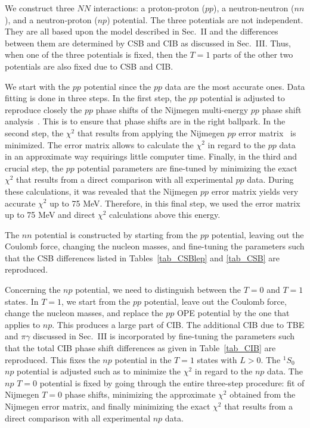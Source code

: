 We construct three $NN$ interactions:
a proton-proton ($pp$), a neutron-neutron ($nn$),
and a neutron-proton ($np$) potential.
The three potentials are not independent. They are all based
upon the model described in Sec.~II and the differences
between them are determined by CSB and CIB as discussed
in Sec.~III. Thus, when one of the three potentials is fixed,
then the $T=1$ parts of the other two potentials
are also fixed due to CSB and CIB.

We start with the $pp$ potential since the $pp$ data are the most
accurate ones. Data fitting is done in three steps. In the first step,
the $pp$ potential is adjusted to reproduce
closely the $pp$ phase shifts of the Nijmegen
multi-energy $pp$ phase shift analysis~\cite{Sto93}.
This is to ensure that phase shifts are in the right ballpark.
In the second step, the $\chi^2$ 
that results
from applying the Nijmegen $pp$ error matrix~\cite{SS93} 
is minimized. 
The error matrix allows to calculate the $\chi^2$ in regard to
the $pp$ data in an approximate way requirings little computer time.
Finally, in the third and crucial step, the $pp$ potential parameters
are fine-tuned by minimizing the exact $\chi^2$ that results from a direct
comparison with all experimental $pp$ data. 
During these calculations, it was revealed that the Nijmegen $pp$ error matrix
yields very accurate $\chi^2$ up to 75 MeV. 
Therefore, in this final step, we used the error matrix up to 75 MeV and
direct $\chi^2$ calculations above this energy.

The $nn$ potential is constructed by starting from the $pp$
potential, leaving out the Coulomb force, changing the nucleon masses, 
and fine-tuning the parameters
such that the CSB differences listed in Tables~\ref{tab_CSBlep}
and \ref{tab_CSB} are reproduced.

Concerning the $np$ potential, we need to distinguish between the
$T=0$ and $T=1$ states. In $T=1$, we start from the $pp$ potential,
leave out the Coulomb force, change the nucleon masses,
and replace the $pp$ OPE potential by the one
that applies to $np$. This produces a large part of CIB. 
The additional CIB due to TBE and $\pi\gamma$ discussed in Sec.~III
is incorporated by fine-tuning the parameters such that the total
CIB phase shift differences as given in Table~\ref{tab_CIB}
are reproduced.
This fixes the $np$ potential in the $T=1$ states with
$L>0$. The $^1S_0$ $np$ potential is adjusted such as to
minimize the $\chi^2$ in regard to the $np$ data.
The $np$ $T=0$ potential is fixed by going through the
entire three-step procedure: fit of Nijmegen $T=0$ phase shifts,
minimizing the approximate $\chi^2$ obtained from the
Nijmegen error matrix, and
finally minimizing the exact $\chi^2$ that results from a direct 
comparison with all experimental $np$ data. 


